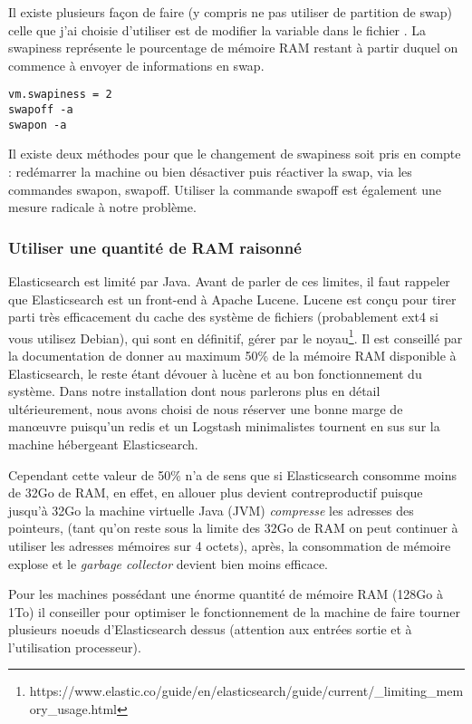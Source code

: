 Il existe plusieurs façon de faire (y compris ne pas utiliser de partition de swap)
celle que j'ai choisie d'utiliser est de modifier la variable 
dans le fichier . La swapiness représente le pourcentage
de mémoire RAM restant à partir duquel on commence à envoyer de informations en
swap.

\begin{lstlisting}[style=code,label={lst:configswapiness},caption={Configuration swapiness}]
vm.swapiness = 2
swapoff -a
swapon -a
\end{lstlisting}
Il existe deux méthodes pour que le changement de swapiness soit pris en compte :
redémarrer la machine ou bien désactiver puis réactiver la swap, via les commandes
swapon, swapoff. Utiliser la commande swapoff est également une mesure radicale à 
notre problème.

\subsubsection{Utiliser une quantité de RAM raisonné}
Elasticsearch est limité par Java. Avant de parler de ces limites, il faut rappeler 
que Elasticsearch est un front-end à Apache Lucene. Lucene est conçu pour tirer 
parti très efficacement du cache des système de fichiers (probablement ext4 si 
vous utilisez Debian), qui sont en définitif, gérer par le 
noyau\footnote{https://www.elastic.co/guide/en/elasticsearch/guide/current/\_limiting\_memory\_usage.html}.
Il est conseillé par la documentation de donner au maximum 50\% de la mémoire RAM
disponible à Elasticsearch, le reste étant dévouer à lucène et au bon fonctionnement
du système.
Dans notre installation dont nous parlerons plus en détail ultérieurement, nous 
avons choisi de nous réserver une bonne marge de manœuvre puisqu'un redis et un Logstash
minimalistes tournent en sus sur la machine hébergeant Elasticsearch.

Cependant cette valeur de 50\% n'a de sens que si Elasticsearch consomme moins de 
32Go de RAM, en effet, en allouer plus devient contreproductif puisque jusqu'à 32Go
la machine virtuelle Java (JVM) \textit{compresse} les adresses des pointeurs, 
(tant qu'on reste sous la limite des 32Go de RAM on peut continuer à utiliser les 
adresses mémoires sur 4 octets), après, la consommation de mémoire explose et le
\textit{garbage collector} devient bien moins efficace.

Pour les machines possédant une énorme quantité de mémoire RAM (128Go à 1To)
il conseiller pour optimiser le fonctionnement de la machine de faire tourner plusieurs
noeuds d'Elasticsearch dessus (attention aux entrées sortie et à l'utilisation processeur).

